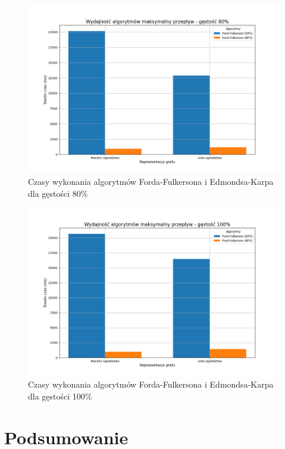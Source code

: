 \documentclass{article}
\begin{document}
\begin{figure}[H]
    \centering
    \includegraphics[scale=0.5]{../Python/charts_type2/Typ2_MAX_FLOW_gestosc80_wykres.png}
    \caption{Czasy wykonania algorytmów Forda-Fulkersona i Edmondsa-Karpa dla gęstości 80\%}
\end{figure}

\begin{figure}[H]
    \centering
    \includegraphics[scale=0.5]{../Python/charts_type2/Typ2_MAX_FLOW_gestosc100_wykres.png}
    \caption{Czasy wykonania algorytmów Forda-Fulkersona i Edmondsa-Karpa dla gęstości 100\%}
\end{figure}

\section{Podsumowanie}
\end{document}
